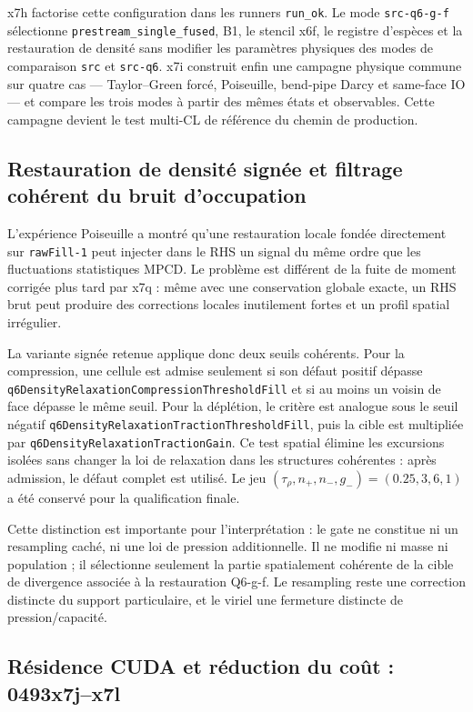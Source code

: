 \documentclass[11pt,a4paper]{article}
\begin{document}
x7h factorise cette configuration dans les runners \texttt{run\_ok}. Le mode \texttt{src-q6-g-f} sélectionne \texttt{prestream\_single\_fused}, B1, le stencil x6f, le registre d'espèces et la restauration de densité sans modifier les paramètres physiques des modes de comparaison \texttt{src} et \texttt{src-q6}. x7i construit enfin une campagne physique commune sur quatre cas --- Taylor--Green forcé, Poiseuille, bend-pipe Darcy et same-face IO --- et compare les trois modes à partir des mêmes états et observables. Cette campagne devient le test multi-CL de référence du chemin de production.

\subsection{Restauration de densité signée et filtrage cohérent du bruit d'occupation}

L'expérience Poiseuille a montré qu'une restauration locale fondée directement sur \texttt{rawFill-1} peut injecter dans le RHS un signal du même ordre que les fluctuations statistiques MPCD. Le problème est différent de la fuite de moment corrigée plus tard par x7q : même avec une conservation globale exacte, un RHS brut peut produire des corrections locales inutilement fortes et un profil spatial irrégulier.

La variante signée retenue applique donc deux seuils cohérents. Pour la compression, une cellule est admise seulement si son défaut positif dépasse \texttt{q6DensityRelaxationCompressionThresholdFill} et si au moins un voisin de face dépasse le même seuil. Pour la déplétion, le critère est analogue sous le seuil négatif \texttt{q6DensityRelaxationTractionThresholdFill}, puis la cible est multipliée par \texttt{q6DensityRelaxationTractionGain}. Ce test spatial élimine les excursions isolées sans changer la loi de relaxation dans les structures cohérentes : après admission, le défaut complet est utilisé. Le jeu $(\tau_\rho,n_+,n_-,g_-)=(0.25,3,6,1)$ a été conservé pour la qualification finale.

Cette distinction est importante pour l'interprétation : le gate ne constitue ni un resampling caché, ni une loi de pression additionnelle. Il ne modifie ni masse ni population ; il sélectionne seulement la partie spatialement cohérente de la cible de divergence associée à la restauration Q6-g-f. Le resampling reste une correction distincte du support particulaire, et le viriel une fermeture distincte de pression/capacité.

\subsection{Résidence CUDA et réduction du coût : 0493x7j--x7l}
\end{document}
